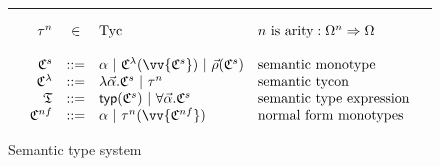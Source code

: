 \begin{figure}
\centering
\small
\hrule
\[
\begin{array}{rcll}
    \tau^n & \in & \mathrm{Tyc} & n\textrm{ is arity}: \Omega^n\Rightarrow \Omega\\
\\
    \mathfrak{C}^s & ::= &
    \alpha~|~\mathfrak{C}^\lambda(\vv{\mathfrak{C}^s})~|~\vec{\rho}(\mathfrak{C}^s)
 & \textrm{semantic monotype}\\
    \mathfrak{C}^\lambda & ::= &
    \lambda\vec{\alpha}.\mathfrak{C}^s~|~\tau^n & \textrm{semantic tycon}\\
    \mathfrak{T} & ::= &
    \mathsf{typ}(\mathfrak{C}^s)~|~\forall\vec{\alpha}.\mathfrak{C}^s
    & \textrm{semantic type expression}\\
    \mathfrak{C}^{nf} & ::= &
    \alpha~|~\tau^n(\vv{\mathfrak{C}^{nf}}) & \textrm{normal form monotypes}\\
\end{array}
\]
\caption{Semantic type system}
\label{fig:semtypesystem}
\end{figure}